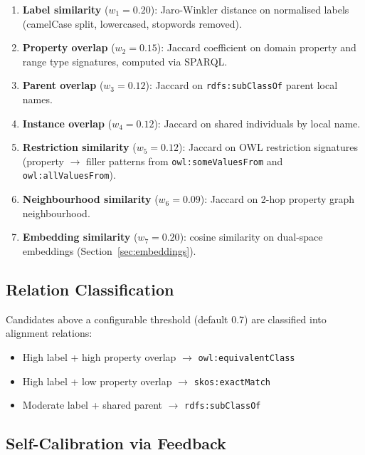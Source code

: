 \documentclass[runningheads]{llncs}
\begin{document}
\begin{enumerate}
    \item \textbf{Label similarity} ($w_1 = 0.20$): Jaro-Winkler distance on normalised labels (camelCase split, lowercased, stopwords removed).

    \item \textbf{Property overlap} ($w_2 = 0.15$): Jaccard coefficient on domain property and range type signatures, computed via SPARQL.

    \item \textbf{Parent overlap} ($w_3 = 0.12$): Jaccard on \texttt{rdfs:subClassOf} parent local names.

    \item \textbf{Instance overlap} ($w_4 = 0.12$): Jaccard on shared individuals by local name.

    \item \textbf{Restriction similarity} ($w_5 = 0.12$): Jaccard on OWL restriction signatures (property $\to$ filler patterns from \texttt{owl:someValuesFrom} and \texttt{owl:allValuesFrom}).

    \item \textbf{Neighbourhood similarity} ($w_6 = 0.09$): Jaccard on 2-hop property graph neighbourhood.

    \item \textbf{Embedding similarity} ($w_7 = 0.20$): cosine similarity on dual-space embeddings (Section~\ref{sec:embeddings}).
\end{enumerate}

\subsection{Relation Classification}

Candidates above a configurable threshold (default 0.7) are classified into alignment relations:

\begin{itemize}
    \item High label + high property overlap $\to$ \texttt{owl:equivalentClass}
    \item High label + low property overlap $\to$ \texttt{skos:exactMatch}
    \item Moderate label + shared parent $\to$ \texttt{rdfs:subClassOf}
\end{itemize}

\subsection{Self-Calibration via Feedback}
\end{document}
